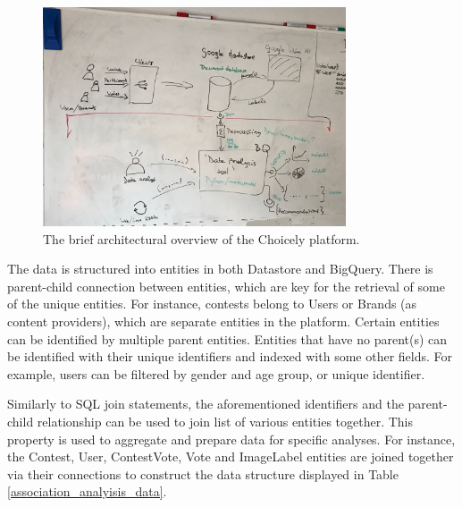     \begin{figure}[h] 
		\begin{center}
            \includegraphics[width=0.8\textwidth]{Images/architecture_whiteboard.jpg}
			\caption{The brief architectural overview of the Choicely platform.}
			\label{choicely_architecture}
		\end{center}
    \end{figure}

    The data is structured into entities in both Datastore and BigQuery. There is parent-child connection between entities, which are key for the retrieval of some of the unique entities. For instance, contests belong to Users or Brands (as content providers), which are separate entities in the platform. Certain entities can be identified by multiple parent entities. Entities that have no parent(s) can be identified with their unique identifiers and indexed with some other fields. For example, users can be filtered by gender and age group, or unique identifier. 

    Similarly to SQL join statements, the aforementioned identifiers and the parent-child relationship can be used to join list of various entities together. This property is used to aggregate and prepare data for specific analyses. For instance, the Contest, User, ContestVote, Vote and ImageLabel entities are joined together via their connections to construct the data structure displayed in Table \ref{association_analyisis_data}.


